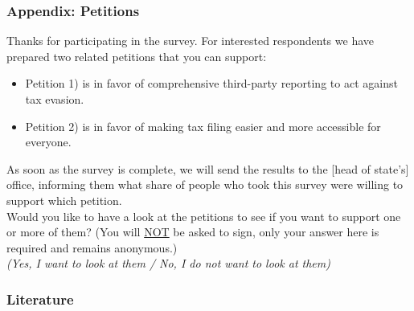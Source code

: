 \documentclass{beamer}
\begin{document}
\begin{frame}[label=Petitions_Appendix]
\frametitle{Appendix: Petitions}
\footnotesize
    Thanks for participating in the survey. For interested respondents we have prepared two related petitions that you can support: 
    \begin{itemize}
        \item Petition 1) is in favor of comprehensive third-party reporting to act against tax evasion. 
        \item Petition 2) is in favor of making tax filing easier and more accessible for everyone. 
    \end{itemize}
    As soon as the survey is complete, we will send the results to the [head of state’s] office, informing them what share of people who took this survey were willing to support which petition. \\ 
    \vspace{0.5em} 
    Would you like to have a look at the petitions to see if you want to support one or more of them? (You will \underline{NOT} be asked to sign, only your answer here is required and remains anonymous.)\\ 
\vspace{0.5em} 
\textit{(Yes, I want to look at them / No, I do not want to look at them)} 
\vfill
\hfill 
\hyperlink{Petitions}{}
\end{frame}

\begin{frame}[allowframebreaks]
  \frametitle{Literature}
  \printbibliography
\end{frame}



\end{document}
